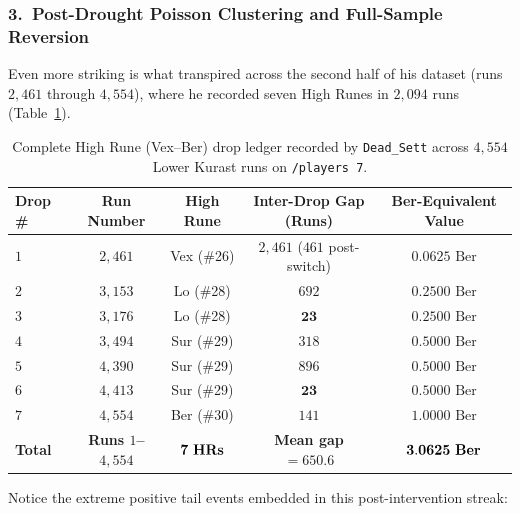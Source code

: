 \documentclass[11pt,reqno]{amsart}
\theoremstyle{definition}
\begin{document}
\subsubsection*{3.\ Post-Drought Poisson Clustering and Full-Sample Reversion}
Even more striking is what transpired across the second half of his dataset (runs $2{,}461$ through $4{,}554$), where he recorded seven High Runes in $2{,}094$ runs (Table~\ref{tab:deadsett}).
\begin{table}[htbp]
\centering
\caption{Complete High Rune (Vex--Ber) drop ledger recorded by \texttt{Dead\_Sett} across $4{,}554$ Lower Kurast runs on \texttt{/players~7}.}
\label{tab:deadsett}
\small
\begin{tabular}{@{}lcccc@{}}
\toprule
Drop \# & Run Number & High Rune & Inter-Drop Gap (Runs) & Ber-Equivalent Value \\
\midrule
$1$ & $2{,}461$ & Vex (\#26) & $2{,}461$ ($461$ post-switch) & $0.0625\text{ Ber}$ \\
$2$ & $3{,}153$ & Lo (\#28)  & $692$                         & $0.2500\text{ Ber}$ \\
$3$ & $3{,}176$ & Lo (\#28)  & $\mathbf{23}$                 & $0.2500\text{ Ber}$ \\
$4$ & $3{,}494$ & Sur (\#29) & $318$                         & $0.5000\text{ Ber}$ \\
$5$ & $4{,}390$ & Sur (\#29) & $896$                         & $0.5000\text{ Ber}$ \\
$6$ & $4{,}413$ & Sur (\#29) & $\mathbf{23}$                 & $0.5000\text{ Ber}$ \\
$7$ & $4{,}554$ & Ber (\#30) & $141$                         & $1.0000\text{ Ber}$ \\
\midrule
\textbf{Total} & \textbf{Runs $1$--$4{,}554$} & $\mathbf{7\text{ \textbf{HRs}}}$ & \textbf{Mean gap $= 650.6$} & $\mathbf{3.0625\text{ \textbf{Ber}}}$ \\
\bottomrule
\end{tabular}
\end{table}
Notice the extreme positive tail events embedded in this post-intervention streak:
\end{document}
